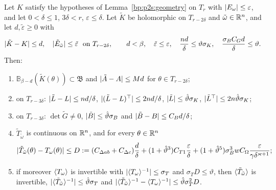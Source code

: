 \begin{lemma}\label{bp:p2s:perturbation}
Let $K$ satisfy the hypotheses of Lemma~\ref{bp:p2s:geometry} on $T_r$ with $\lvert E_\omega\rvert\le\varepsilon$, and let $0<\delta\le1$,
$3\delta<r$, $\varepsilon\le\delta$. Let $\tilde K$ be holomorphic on $T_{r-2\delta}$ and $\tilde\omega\in\mathbb{R}^n$, and let
$d,\tilde\varepsilon\ge0$ with
\[
\lvert \tilde K-K\rvert\le d,\quad\lvert \tilde E_{\tilde\omega}\rvert\le\tilde\varepsilon\ \text{ on }T_{r-2\delta},\qquad d<\beta,\quad
\tilde\varepsilon\le\varepsilon,\quad\frac{nd}\delta\le\vartheta\sigma_K,\quad\frac{\sigma_BC_Gd}\delta\le\vartheta.
\]
Then:
\begin{enumerate}[label=(\alph*)]
\item $\mathbb B_{\beta-d}(\tilde K(\theta))\subset\mathfrak B$ and $\lvert \tilde A-A\rvert\le Md$ for $\theta\in T_{r-2\delta}$;
\item on $T_{r-3\delta}$: $\lvert \tilde L-L\rvert\le nd/\delta$, $\lvert (\tilde L-L)^\top\rvert\le2nd/\delta$, $\lvert \tilde L\rvert\le\hat\vartheta\sigma_K$,
  $\lvert \tilde L^\top\rvert\le2n\hat\vartheta\sigma_K$;
\item on $T_{r-3\delta}$: $\det\tilde G\ne0$, $\lvert \tilde B\rvert\le\hat\vartheta\sigma_B$ and $\lvert \tilde B-B\rvert\le C_Bd/\delta$;
\item $\tilde T_{\tilde\omega}$ is continuous on $\mathbb{R}^n$, and for every $\theta\in\mathbb{R}^n$
  \[
  \lvert \tilde T_{\tilde\omega}(\theta)-T_\omega(\theta)\rvert\le D:=(C_{\Delta ab}+C_{\Delta c})\frac d\delta+(1+\hat\vartheta^3)C_{T1}\frac\varepsilon\delta
  +(1+\hat\vartheta^5)\sigma_B^3wC_\Omega\frac\varepsilon{\gamma\delta^{\varkappa+1}};
  \]
\item if moreover $\langle T_\omega\rangle$ is invertible with $\lvert \langle T_\omega\rangle^{-1}\rvert\le\sigma_T$ and $\sigma_TD\le\vartheta$, then
  $\langle \tilde T_{\tilde\omega}\rangle$ is invertible, $\lvert \langle \tilde T_{\tilde\omega}\rangle^{-1}\rvert\le\hat\vartheta\sigma_T$ and
  $\lvert \langle \tilde T_{\tilde\omega}\rangle^{-1}-\langle T_\omega\rangle^{-1}\rvert\le\hat\vartheta\sigma_T^2D$.
\end{enumerate}
\end{lemma}

